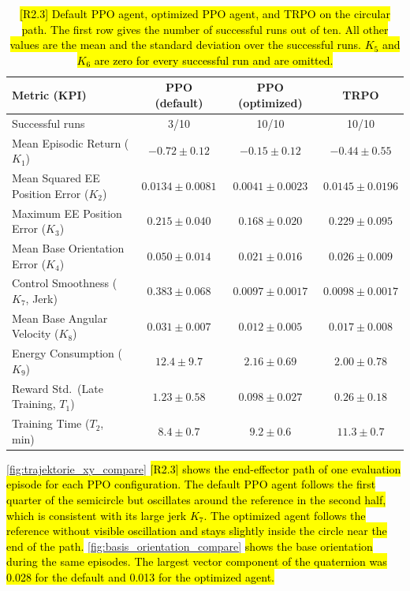 \documentclass{ieeeaccess}
\newcommand{\hlone}[1]{{\sethlcolor{rone}\hl{#1}}}
\begin{document}
\begin{table}[t]
	\centering
	\caption{\hlone{[R2.3] Default PPO agent, optimized PPO agent, and TRPO on the circular path. The first row gives the
		number of successful runs out of ten. All other values are the mean and the standard deviation over
		the successful runs. $K_5$ and $K_6$ are zero for every successful run and are omitted.}}
    \label{tab:ppo_optimization_kpi}
	\renewcommand{\arraystretch}{1.2}
	\setlength{\tabcolsep}{8pt}
	\begin{tabular}{lccc}
		\toprule
		\textbf{Metric (KPI)} & \textbf{PPO (default)} & \textbf{PPO (optimized)} & \textbf{TRPO} \\
		\midrule
		Successful runs & 3/10 & 10/10 & 10/10 \\
		Mean Episodic Return ($K_1$) & $-0.72 \pm 0.12$ & $-0.15 \pm 0.12$ & $-0.44 \pm 0.55$ \\
		Mean Squared EE Position Error ($K_2$) & $0.0134 \pm 0.0081$ & $0.0041 \pm 0.0023$ & $0.0145 \pm 0.0196$ \\
		Maximum EE Position Error ($K_3$) & $0.215 \pm 0.040$ & $0.168 \pm 0.020$ & $0.229 \pm 0.095$ \\
		Mean Base Orientation Error ($K_4$) & $0.050 \pm 0.014$ & $0.021 \pm 0.016$ & $0.026 \pm 0.009$ \\
		Control Smoothness ($K_7$, Jerk) & $0.383 \pm 0.068$ & $0.0097 \pm 0.0017$ & $0.0098 \pm 0.0017$ \\
		Mean Base Angular Velocity ($K_8$) & $0.031 \pm 0.007$ & $0.012 \pm 0.005$ & $0.017 \pm 0.008$ \\
		Energy Consumption ($K_9$) & $12.4 \pm 9.7$ & $2.16 \pm 0.69$ & $2.00 \pm 0.78$ \\
		Reward Std.\ (Late Training, $T_1$) & $1.23 \pm 0.58$ & $0.098 \pm 0.027$ & $0.26 \pm 0.18$ \\
		Training Time ($T_2$, min) & $8.4 \pm 0.7$ & $9.2 \pm 0.6$ & $11.3 \pm 0.7$ \\
		\bottomrule
	\end{tabular}
\end{table}

\cref{fig:trajektorie_xy_compare} \hlone{[R2.3] shows the end-effector path of one evaluation episode for each PPO
configuration. The default PPO agent follows the first quarter of the semicircle but oscillates around
the reference in the second half, which is consistent with its large jerk $K_7$. The optimized agent
follows the reference without visible oscillation and stays slightly inside the circle near the end of
the path.} \cref{fig:basis_orientation_compare} \hlone{shows the base orientation during the same episodes. The
largest vector component of the quaternion was 0.028 for the default and 0.013 for the optimized agent.}
\end{document}
